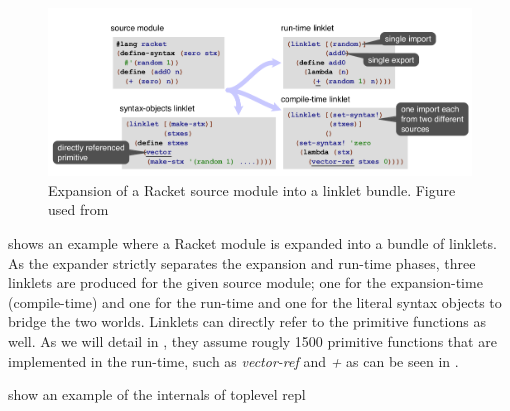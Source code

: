 \begin{figure}[h]
  \centering
  \includegraphics[scale=0.3]{img/racket-expand-example}
  \caption{Expansion of a Racket source module into a linklet
    bundle. Figure used from \cite{racket-on-chez-19}}
  \label{fig:racket-expand-example}
\end{figure}

 shows an example where a Racket
module is expanded into a bundle of linklets. As the expander strictly
separates the expansion and run-time phases, three linklets are
produced for the given source module; one for the expansion-time
(compile-time) and one for the run-time and one for the literal syntax
objects to bridge the two worlds. Linklets can directly refer to the
primitive functions as well. As we will detail in
, they assume rougly 1500 primitive functions
that are implemented in the run-time, such as \emph{vector-ref} and
\emph{+} as can be seen in .

show an example of the internals of toplevel repl

